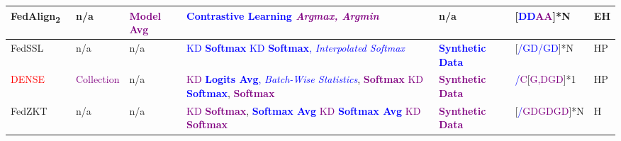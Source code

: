 \begin{table}[htp]
\begin{longtable}{|p{1.68cm}|p{1.2cm}|p{1.25cm}|p{5.0cm}|p{2.59cm}|p{1.2cm}|p{0.35cm}|}
    \rowcolor[gray]{.9}
    FedAlign\textsubscript{2}~\cite{zhang2023federated} & n/a &\textcolor{purple}{Model Avg}&\textcolor{blue}{Contrastive Learning}  \textcolor{purple}{\textit{Argmax, Argmin}} & n/a & [\textcolor{blue}{DD}\textcolor{purple}{AA}]*N & EH \\ \hline

    FedSSL~\cite{fan2022private} & n/a & n/a & \textcolor{blue}{KD} \textcolor{blue}{\textbf{Softmax}} \textcolor{blue}{KD} \textcolor{blue}{\textbf{Softmax}, \textit{Interpolated Softmax}} & \textcolor{blue}{\textbf{Synthetic Data}} & [\textcolor{blue}{/GD/GD}]*N & HP \\ \hline
    
    \rowcolor[gray]{.9}
    \textcolor{red}{DENSE}~\cite{zhang2022dense} & \textcolor{purple}{Collection} & n/a & \textcolor{purple}{KD} \textcolor{blue}{\textbf{Logits Avg}, \textit{Batch-Wise Statistics}}, \textcolor{purple}{\textbf{Softmax}} \newline \textcolor{purple}{KD} \textcolor{blue}{\textbf{Softmax}}, \textcolor{purple}{\textbf{Softmax}} & \textcolor{purple}{\textbf{Synthetic Data}} & \textcolor{blue}{/}\textcolor{purple}{C}[\textcolor{purple}{G,DGD}]*1 & HP \\ \hline %

    FedZKT~\cite{zhang2022fedzkt} & n/a & n/a &\textcolor{purple}{KD} \textcolor{purple}{\textbf{Softmax}}, \textcolor{blue}{\textbf{Softmax Avg}} \textcolor{purple}{KD} \textcolor{blue}{\textbf{Softmax Avg}} \textcolor{purple}{KD} \textcolor{purple}{\textbf{Softmax}} & \textcolor{purple}{\textbf{Synthetic Data}} & [\textcolor{blue}{/}\textcolor{purple}{GDGDGD}]*N & H \\ \hline

  \end{longtable}
\end{table}

